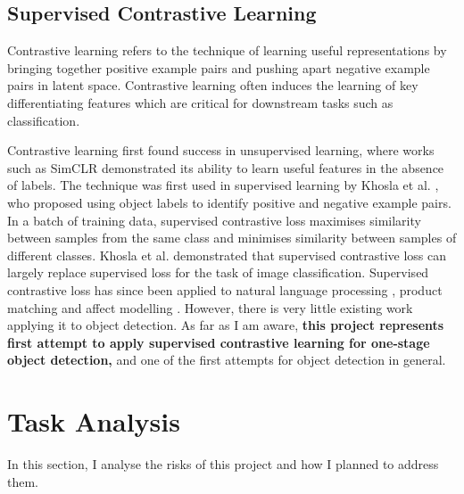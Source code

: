 \documentclass[12pt,a4paper,twoside,openany]{report}
\begin{document}
\subsection{Supervised Contrastive Learning}
Contrastive learning refers to the technique of learning useful representations by bringing together positive example pairs and pushing apart negative example pairs in latent space. Contrastive learning often induces the learning of key differentiating features which are critical for downstream tasks such as classification.

Contrastive learning first found success in unsupervised learning, where works such as SimCLR \cite{chen_simple_2020} demonstrated its ability to learn useful features in the absence of labels.
The technique was first used in supervised learning by Khosla et al. \cite{khosla_supervised_2021}, who proposed using object labels to identify positive and negative example pairs. In a batch of training data, supervised contrastive loss maximises similarity between samples from the same class and minimises similarity between samples of different classes. Khosla et al. demonstrated that supervised contrastive loss can largely replace supervised loss for the task of image classification. Supervised contrastive loss has since been applied to natural language processing \cite{gunel_supervised_2021}, product matching \cite{peeters_supervised_2022} and affect modelling \cite{pinitas_supervised_2022}. However, there is very little existing work applying it to object detection. As far as I am aware, \textbf{this project represents first attempt to apply supervised contrastive learning for one-stage object detection,} and one of the first attempts for object detection in general.


\section{Task Analysis}
In this section, I analyse the risks of this project and how I planned to address them.
\end{document}

